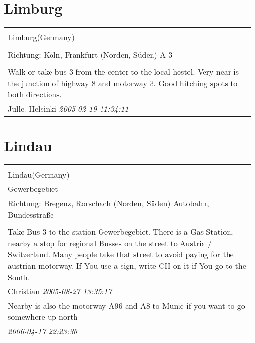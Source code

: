 \documentclass[a4paper,12pt]{article}
\begin{document}
\section{Limburg}
\begin{tabular}{|p{13cm}|}
\hline\\
Limburg(Germany)\\
\\
Richtung: Köln, Frankfurt (Norden, Süden) A 3 \\
\hline\\
Walk or take bus 3 from the center to the local hostel. Very near is the junction of highway 8 and motorway 3. Good hitching spots to both directions. \\
Julle, Helsinki \textit{ 2005-02-19 11:34:11 }\\\hline
\end{tabular}


\section{Lindau}
\begin{tabular}{|p{13cm}|}
\hline\\
Lindau(Germany)\\
Gewerbegebiet\\
Richtung: Bregenz, Rorschach (Norden, Süden) Autobahn, Bundesstraße \\
\hline\\
Take Bus 3 to the station Gewerbegebiet. There is a Gas Station, nearby a stop for regional Busses on the street to Austria / Switzerland. Many people take that street to avoid paying for the austrian motorway. If You use a sign, write CH on it if You go to the South. \\
Christian \textit{ 2005-08-27 13:35:17 }\\\hline Nearby is also the motorway A96 and A8 to Munic if you want to go somewhere up north \\
\textit{ 2006-04-17 22:23:30 }\\\hline
\end{tabular}
\end{document}

